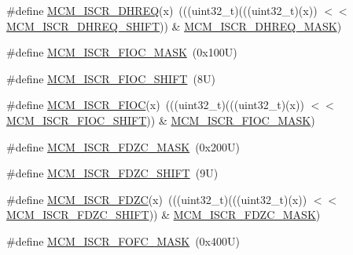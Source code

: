 \begin{DoxyCompactItemize}
\item 
\#define \mbox{\hyperlink{group___m_c_m___register___masks_ga1ae2ac2776e7deae32f4a9fbb2f791b8}{M\+C\+M\+\_\+\+I\+S\+C\+R\+\_\+\+D\+H\+R\+EQ}}(x)~(((uint32\+\_\+t)(((uint32\+\_\+t)(x)) $<$$<$ \mbox{\hyperlink{group___m_c_m___register___masks_gac03fba0494ea82e25a9b865d863f79ea}{M\+C\+M\+\_\+\+I\+S\+C\+R\+\_\+\+D\+H\+R\+E\+Q\+\_\+\+S\+H\+I\+FT}})) \& \mbox{\hyperlink{group___m_c_m___register___masks_ga8c932ffbc33cc5872065ee34f7bd2f0b}{M\+C\+M\+\_\+\+I\+S\+C\+R\+\_\+\+D\+H\+R\+E\+Q\+\_\+\+M\+A\+SK}})
\item 
\#define \mbox{\hyperlink{group___m_c_m___register___masks_ga701558b3e4efc5c15bea4770c14a43ff}{M\+C\+M\+\_\+\+I\+S\+C\+R\+\_\+\+F\+I\+O\+C\+\_\+\+M\+A\+SK}}~(0x100\+U)
\item 
\#define \mbox{\hyperlink{group___m_c_m___register___masks_gac6e94708b3e6f09a0355afb3756826fc}{M\+C\+M\+\_\+\+I\+S\+C\+R\+\_\+\+F\+I\+O\+C\+\_\+\+S\+H\+I\+FT}}~(8\+U)
\item 
\#define \mbox{\hyperlink{group___m_c_m___register___masks_gae8ef8736457d95f0995b7ae7be15774f}{M\+C\+M\+\_\+\+I\+S\+C\+R\+\_\+\+F\+I\+OC}}(x)~(((uint32\+\_\+t)(((uint32\+\_\+t)(x)) $<$$<$ \mbox{\hyperlink{group___m_c_m___register___masks_gac6e94708b3e6f09a0355afb3756826fc}{M\+C\+M\+\_\+\+I\+S\+C\+R\+\_\+\+F\+I\+O\+C\+\_\+\+S\+H\+I\+FT}})) \& \mbox{\hyperlink{group___m_c_m___register___masks_ga701558b3e4efc5c15bea4770c14a43ff}{M\+C\+M\+\_\+\+I\+S\+C\+R\+\_\+\+F\+I\+O\+C\+\_\+\+M\+A\+SK}})
\item 
\#define \mbox{\hyperlink{group___m_c_m___register___masks_ga5ef4e15eaa1fbc668e0e3733f44627fe}{M\+C\+M\+\_\+\+I\+S\+C\+R\+\_\+\+F\+D\+Z\+C\+\_\+\+M\+A\+SK}}~(0x200\+U)
\item 
\#define \mbox{\hyperlink{group___m_c_m___register___masks_gab5494db259f54a8e5f57134ca2d29516}{M\+C\+M\+\_\+\+I\+S\+C\+R\+\_\+\+F\+D\+Z\+C\+\_\+\+S\+H\+I\+FT}}~(9\+U)
\item 
\#define \mbox{\hyperlink{group___m_c_m___register___masks_ga31a64eb94277260fe6785d4df3247dda}{M\+C\+M\+\_\+\+I\+S\+C\+R\+\_\+\+F\+D\+ZC}}(x)~(((uint32\+\_\+t)(((uint32\+\_\+t)(x)) $<$$<$ \mbox{\hyperlink{group___m_c_m___register___masks_gab5494db259f54a8e5f57134ca2d29516}{M\+C\+M\+\_\+\+I\+S\+C\+R\+\_\+\+F\+D\+Z\+C\+\_\+\+S\+H\+I\+FT}})) \& \mbox{\hyperlink{group___m_c_m___register___masks_ga5ef4e15eaa1fbc668e0e3733f44627fe}{M\+C\+M\+\_\+\+I\+S\+C\+R\+\_\+\+F\+D\+Z\+C\+\_\+\+M\+A\+SK}})
\item 
\#define \mbox{\hyperlink{group___m_c_m___register___masks_ga4bf392796fdb8f19596f1831b9305443}{M\+C\+M\+\_\+\+I\+S\+C\+R\+\_\+\+F\+O\+F\+C\+\_\+\+M\+A\+SK}}~(0x400\+U)
$$
\end{DoxyCompactItemize}
